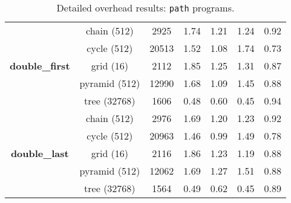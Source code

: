 \begin{table}[ht]
{\begin{tabular}{cc|c|cc|cc}
   \multirow{5}{*}{\textbf{double\_first}} &  chain  (512)  &  2925 &  1.74  &  1.21  &  1.24 &  0.92 \\
   &  cycle  (512)  &  20513 &  1.52  &  1.08  &  1.74 &  0.73 \\
   &  grid  (16)  &  2112 &  1.85  &  1.25  &  1.31 &  0.87 \\
   &  pyramid  (512)  &  12990 &  1.68  &  1.09  &  1.45 &  0.88 \\
   &  tree  (32768)  &  1606 &  0.48  &  0.60  &  0.45 &  0.94 \\
   \hline
   \multirow{5}{*}{\textbf{double\_last}} &  chain  (512)  &  2976 &  1.69  &  1.20  &  1.23 &  0.92 \\
   &  cycle  (512)  &  20963 &  1.46  &  0.99  &  1.49 &  0.78 \\
   &  grid  (16)  &  2116 &  1.86  &  1.23  &  1.19 &  0.88 \\
   &  pyramid  (512)  &  12062 &  1.69  &  1.27  &  1.51 &  0.88 \\
   &  tree  (32768)  &  1564 &  0.49  &  0.62  &  0.45 &  0.89 \\
   \hline
\hline
\end{tabular}
}
\caption{Detailed overhead results: \texttt{path} programs.}
\label{tbl:overhead_detail_tst}
\end{table}